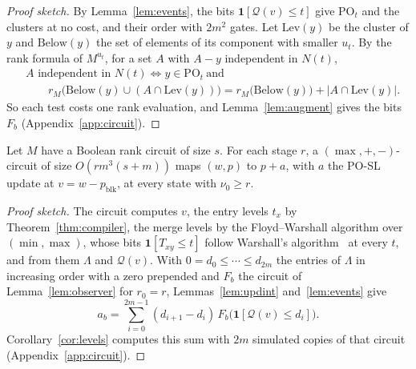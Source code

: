 \documentclass[runningheads,envcountsame]{llncs}
\newcommand{\blk}{\operatorname{blk}}
\newcommand{\PO}{\mathrm{PO}}
\begin{document}
\begin{proof}[Proof sketch]
By Lemma~\ref{lem:events}, the bits $\mathbf 1[\mathcal Q(v)\le t]$ give $\PO_t$
and the clusters at no cost, and their order with $2m^{2}$ gates.  Let
$\mathrm{Lev}(y)$ be the cluster of $y$ and $\mathrm{Below}(y)$ the set of
elements of its component with smaller $u_t$.  By the rank formula of $M^{u_t}$,
for a set $A$ with $A-y$ independent in $N(t)$,
\[
  \begin{aligned}
  &A\text{ independent in }N(t)\iff y\in\PO_t\ \text{and}\\
  &\qquad r_M\bigl(\mathrm{Below}(y)\cup(A\cap\mathrm{Lev}(y))\bigr)
  =r_M\bigl(\mathrm{Below}(y)\bigr)+|A\cap\mathrm{Lev}(y)|.
  \end{aligned}
\]
So each test costs one rank evaluation, and Lemma~\ref{lem:augment} gives the
bits $F_b$ (Appendix~\ref{app:circuit}).
\end{proof}

\begin{lemma}
\label{lem:oneupdate}
Let $M$ have a Boolean rank circuit of size $s$.  For each stage $r$, a
$(\max,+,-)$-circuit of size $O(rm^{3}(s+m))$ maps
$(w,p)$ to $p+a$, with $a$ the PO-SL update at $v=w-p_{\blk}$, at every state
with $\nu_0\ge r$.
\end{lemma}

\begin{proof}[Proof sketch]
The circuit computes $v$, the entry levels $t_x$ by
Theorem~\ref{thm:compiler}, the merge levels by the Floyd--Warshall algorithm
over $(\min,\max)$, whose bits $\mathbf 1[T_{xy}\le t]$ follow Warshall's
algorithm~\cite{warshall62} at every $t$, and from them $\Lambda$ and
$\mathcal Q(v)$.  With $0=d_0\le\cdots\le d_{2m}$ the entries of $\Lambda$ in
increasing order with a zero prepended and $F_b$
the circuit of Lemma~\ref{lem:observer} for $r_0=r$, Lemmas~\ref{lem:updint}
and~\ref{lem:events} give
\[
  a_b=\sum_{i=0}^{2m-1}(d_{i+1}-d_i)\,F_b\bigl(\mathbf 1[\mathcal Q(v)\le d_i]\bigr).
\]
Corollary~\ref{cor:levels} computes this sum with $2m$ simulated copies of that
circuit (Appendix~\ref{app:circuit}).
\end{proof}
\end{document}
